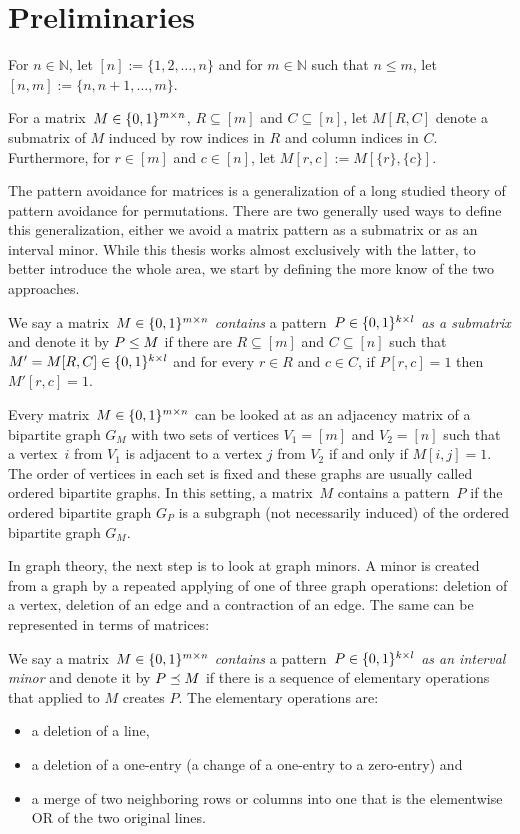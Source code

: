 \section{Preliminaries}
\begin{ntn}
For $n\in\mathbb{N}$, let $[n]:=\{1,2,\dots,n\}$ and for $m\in\mathbb{N}$ such that $n\leq m$, let $[n,m]:=\{n,n+1,\dots,m\}$.
\end{ntn}

\begin{ntn}
For a matrix~$M\in\{0,1\}^{m\times n}$, $R\subseteq[m]$ and $C\subseteq[n]$, let $M[R,C]$ denote a submatrix of $M$ induced by row indices in $R$ and column indices in $C$. Furthermore, for $r\in[m]$ and $c\in[n]$, let $M[r,c]:=M[\{r\},\{c\}]$.
\end{ntn}

The pattern avoidance for matrices is a generalization of a long studied theory of pattern avoidance for permutations. There are two generally used ways to define this generalization, either we avoid a matrix pattern as a submatrix or as an interval minor. While this thesis works almost exclusively with the latter, to better introduce the whole area, we start by defining the more know of the two approaches.

\begin{defn}
We say a matrix~$M\in\{0,1\}^{m\times n}$ \emph{contains} a pattern~$P\in\{0,1\}^{k\times l}$ \emph{as a submatrix} and denote it by $P\leq M$ if there are $R\subseteq[m]$ and $C\subseteq[n]$ such that $M'=M[R,C]\in\{0,1\}^{k\times l}$ and for every $r\in R$ and $c\in C$, if $P[r,c]=1$ then $M'[r,c]=1$.
\end{defn}

Every matrix~$M\in\{0,1\}^{m\times n}$ can be looked at as an adjacency matrix of a bipartite graph $G_M$ with two sets of vertices $V_1=[m]$ and $V_2=[n]$ such that a vertex~$i$ from $V_1$ is adjacent to a vertex $j$ from $V_2$ if and only if $M[i,j]=1$. The order of vertices in each set is fixed and these graphs are usually called ordered bipartite graphs. In this setting, a matrix~$M$ contains a pattern~$P$ if the ordered bipartite graph $G_P$ is a subgraph (not necessarily induced) of the ordered bipartite graph $G_M$.

In graph theory, the next step is to look at graph minors. A minor is created from a graph by a repeated applying of one of three graph operations: deletion of a vertex, deletion of an edge and a contraction of an edge. The same can be represented in terms of matrices:

\begin{defn}
We say a matrix~$M\in\{0,1\}^{m\times n}$ \emph{contains} a pattern~$P\in\{0,1\}^{k\times l}$ \emph{as an interval minor} and denote it by $P\preceq M$ if there is a sequence of elementary operations that applied to $M$ creates $P$. The elementary operations are:
\begin{itemize}
	\item a deletion of a line,
	\item a deletion of a one-entry (a change of a one-entry to a zero-entry) and
	\item a merge of two neighboring rows or columns into one that is the elementwise OR of the two original lines. 
\end{itemize}
\end{defn}

